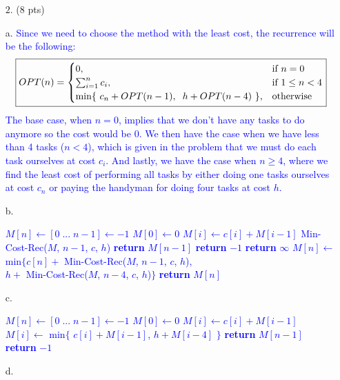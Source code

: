 \documentclass[11pt]{article}
\begin{document}
\begin{itemize}
\item[$2.$] (8 pts)
	\item[a.]
	\textcolor{blue}{
	Since we need to choose the method with the least cost, the recurrence will be the following:  $$\boxed{{\displaystyle OPT(n)={
\begin{cases}{0},&{\text{if }} n = 0\\ \sum_{i=1}^{n} c_i,&{\text{if }} 1 \leq n < 4\\ \text{min\{ } c_n + OPT(n - 1), \text{\hspace{2mm}} h + OPT(n-4)\text{ \}},&{\text{otherwise}} 
\end{cases}}}}$$
The base case, when $n = 0$, implies that we don't have any tasks to do anymore so the cost would be 0. We then have the case when we have less than 4 tasks ($n < 4$), which is given in the problem that we must do each task ourselves at cost $c_i$. And lastly, we have the case when $n \geq 4$, where we find the least cost of performing all tasks by either doing one tasks ourselves at cost $c_n$ or paying the handyman for doing four tasks at cost $h$.
	}
	\item[b.]
\textcolor{blue}{
\begin{algorithmic}[1]
		\State $M[n] \gets [ 0 \phantom{|}...\phantom{|} n - 1] \gets -1$ 
			\State $M[0] \gets 0$
				\State $M[i] \gets c[i] + M[i-1]$
			\EndFor			
		\Else
			\State Min-Cost-Rec($M$, $n-1$, $c$, $h$)
		\EndIf
		\State \textbf{return} $M[n-1]$
	\Else 	
		\State \textbf{return} $-1$
	\EndIf
\EndFunction
{} 
		\State \textbf{return} $\infty$
	\Else
		\State $M[n] \gets$ min$\{$\hspace{1mm}$c[n] +$ Min-Cost-Rec($M$, $n-1$, $c$, $h$), \\ \hspace{4.36cm} $h +$ Min-Cost-Rec($M$, $n-4$, $c$, $h$)\hspace{1mm}$\}$
		\EndIf
		\State \textbf{return} $M[n]$
	\EndIf
\EndFunction
\end{algorithmic}
}
	\item[c.]
	\textcolor{blue}{
\begin{algorithmic}[1]
		\State $M[n] \gets [ 0 \phantom{|}...\phantom{|} n - 1] \gets -1$ 
			\State $M[0] \gets 0$
				\State $M[i] \gets c[i] + M[i-1]$
			\EndFor			
		\Else
				\State $M[i] \gets$ min$\{$ $c[i] + M[i-1]$, $h + M[i-4]$ $\}$
			\EndFor
		\EndIf
		\State \textbf{return} $M[n-1]$
	\Else 	
		\State \textbf{return} $-1$
	\EndIf
\EndFunction
\end{algorithmic}
}
	\item[d.]
	

\end{itemize}
\end{document}
